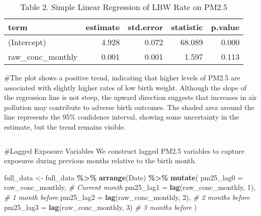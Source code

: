 \documentclass[
]{article}
\newenvironment{Shaded}{\begin{snugshade}}{\end{snugshade}}
\newcommand{\AttributeTok}[1]{\textcolor[rgb]{0.13,0.29,0.53}{#1}}
\newcommand{\CommentTok}[1]{\textcolor[rgb]{0.56,0.35,0.01}{\textit{#1}}}
\newcommand{\DecValTok}[1]{\textcolor[rgb]{0.00,0.00,0.81}{#1}}
\newcommand{\FunctionTok}[1]{\textcolor[rgb]{0.13,0.29,0.53}{\textbf{#1}}}
\newcommand{\NormalTok}[1]{#1}
\newcommand{\OtherTok}[1]{\textcolor[rgb]{0.56,0.35,0.01}{#1}}
\newcommand{\SpecialCharTok}[1]{\textcolor[rgb]{0.81,0.36,0.00}{\textbf{#1}}}
\begin{document}
\begin{longtable}[t]{lrrrr}
\caption{\label{tab:unnamed-chunk-5}Table 2. Simple Linear Regression of LBW Rate on PM2.5}\\
\toprule
term & estimate & std.error & statistic & p.value\\
\midrule
(Intercept) & 4.928 & 0.072 & 68.089 & 0.000\\
raw\_conc\_monthly & 0.001 & 0.001 & 1.597 & 0.113\\
\bottomrule
\end{longtable}

\#The plot shows a positive trend, indicating that higher levels of
PM2.5 are associated with slightly higher rates of low birth weight.
Although the slope of the regression line is not steep, the upward
direction suggests that increases in air pollution may contribute to
adverse birth outcomes. The shaded area around the line represents the
95\% confidence interval, showing some uncertainty in the estimate, but
the trend remains visible.

\begin{verbatim}
\end{verbatim}

\#Lagged Exposure Variables We construct lagged PM2.5 variables to
capture exposures during previous months relative to the birth month.

\begin{Shaded}
\begin{Highlighting}[]
\NormalTok{full\_data }\OtherTok{\textless{}{-}}\NormalTok{ full\_data }\SpecialCharTok{\%\textgreater{}\%}
  \FunctionTok{arrange}\NormalTok{(Date) }\SpecialCharTok{\%\textgreater{}\%}
  \FunctionTok{mutate}\NormalTok{(}
    \AttributeTok{pm25\_lag0 =}\NormalTok{ raw\_conc\_monthly,            }\CommentTok{\# Current month}
    \AttributeTok{pm25\_lag1 =} \FunctionTok{lag}\NormalTok{(raw\_conc\_monthly, }\DecValTok{1}\NormalTok{),     }\CommentTok{\# 1 month before}
    \AttributeTok{pm25\_lag2 =} \FunctionTok{lag}\NormalTok{(raw\_conc\_monthly, }\DecValTok{2}\NormalTok{),     }\CommentTok{\# 2 months before}
    \AttributeTok{pm25\_lag3 =} \FunctionTok{lag}\NormalTok{(raw\_conc\_monthly, }\DecValTok{3}\NormalTok{)      }\CommentTok{\# 3 months before}
\NormalTok{  )}
\end{Highlighting}
\end{Shaded}
\end{document}
